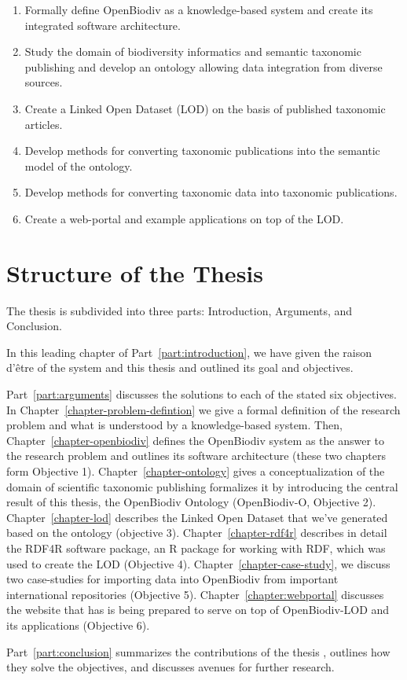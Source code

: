 \begin{enumerate}
\item{Formally define OpenBiodiv as a knowledge-based system and create its integrated software architecture.}
\item{Study the domain of biodiversity informatics and semantic taxonomic publishing and develop an ontology allowing data integration from diverse sources.}
\item{Create a Linked Open Dataset (LOD) on the basis of published taxonomic articles.}
\item{Develop methods for converting taxonomic publications into the semantic model of the ontology.}
\item{Develop methods for converting taxonomic data into taxonomic publications.}
\item{Create a web-portal and example applications on top of the LOD.}
\end{enumerate}


\section{Structure of the Thesis}

The thesis is subdivided into three parts: Introduction, Arguments, and Conclusion.

In this leading chapter of Part~\ref{part:introduction}, we have given the raison d'\^etre of the system and this thesis and outlined its goal and objectives. 

Part~\ref{part:arguments} discusses the solutions to each of the stated six objectives. In Chapter~\ref{chapter-problem-defintion} we give a formal definition of the research problem and what is understood by a knowledge-based system. Then, Chapter~\ref{chapter-openbiodiv} defines the OpenBiodiv system as the answer to the research problem and outlines its software architecture (these two chapters form Objective 1).  Chapter~\ref{chapter-ontology} gives a conceptualization of the domain of scientific taxonomic publishing formalizes it by introducing the central result of this thesis, the OpenBiodiv Ontology (OpenBiodiv-O, Objective 2). Chapter~\ref{chapter-lod} describes the Linked Open Dataset that we've generated based on the ontology (objective 3). Chapter~\ref{chapter-rdf4r} describes in detail the RDF4R software package, an R package for working with RDF, which was used to create the LOD (Objective 4). Chapter~\ref{chapter-case-study}, we discuss two case-studies for importing data into OpenBiodiv from important international repositories (Objective 5). Chapter~\ref{chapter:webportal} discusses the website that has is being prepared to serve on top of OpenBiodiv-LOD and its applications (Objective 6).

Part~\ref{part:conclusion} summarizes the contributions of the thesis , outlines how they solve the objectives, and discusses avenues for further research.







